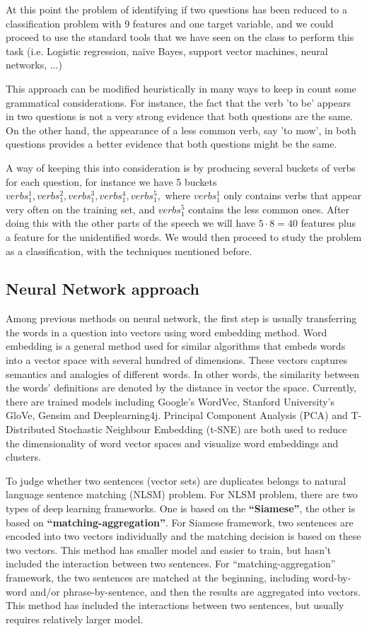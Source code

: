 \documentclass[11pt]{article}
\begin{document}
At this point the problem of identifying if two questions has been reduced to a classification problem with 9 features and one target variable, and we could proceed to use the standard tools that we have seen on the class to perform this task (i.e. Logistic regression, na\"ive Bayes, support vector machines, neural networks, ...)

This approach can be modified heuristically in many ways to keep in count some grammatical considerations. For instance, the fact that the verb 'to be' appears in two questions is not a very strong evidence that both questions are the same. On the other hand, the appearance of a less common verb, say 'to mow', in both questions provides a better evidence that both questions might be the same. 

A way of keeping this into consideration is by producing several buckets of verbs for each question, for instance we have 5 buckets $verbs_1^1, verbs_1^2, verbs_1^3, verbs_1^4, verbs_1^5,$ where $verbs_1^1$ only contains verbs that appear very often on the training set, and $verbs_1^5$ contains the less common ones. After doing this with the other parts of the speech we will have $5 \cdot 8 = 40$ features plus a feature for the unidentified words. We would then proceed to study the problem as a classification, with the techniques mentioned before.

\subsection{Neural Network approach} 
Among previous methods on neural network, the first step is usually transferring the words in a question into vectors using word embedding method. Word embedding is a general method used for similar algorithms that embeds words into a vector space with several hundred of dimensions. These vectors captures semantics and analogies of different words. In other words, the similarity between the words' definitions are denoted by the distance in vector the space. Currently, there are trained models including Google’s WordVec, Stanford University’s GloVe, Gensim and Deeplearning4j.  Principal Component Analysis (PCA) and T-Distributed Stochastic Neighbour Embedding (t-SNE) are both used to reduce the dimensionality of word vector spaces and visualize word embeddings and clusters.

To judge whether two sentences (vector sets) are duplicates belongs to natural language sentence matching (NLSM) problem. For NLSM problem, there are two types of deep learning frameworks. One is based on the \textbf{“Siamese”}, the other is based on \textbf{“matching-aggregation”}. For Siamese framework, two sentences are encoded into two vectors individually and the matching decision is based on these two vectors. This method has smaller model and easier to train, but hasn’t included the interaction between two sentences. For “matching-aggregation” framework, the two sentences are matched at the beginning, including word-by-word and/or phrase-by-sentence, and then the results are aggregated into vectors. This method has included the interactions between two sentences, but usually requires relatively larger model.
\end{document}

